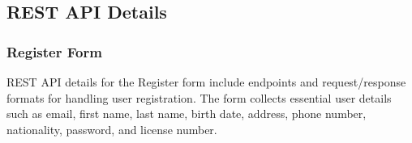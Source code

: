 \subsection{REST API Details}


\subsubsection*{Register Form}


REST API details for the Register form include endpoints and request/response formats for handling user registration. The form collects essential user details such as email, first name, last name, birth date, address, phone number, nationality, password, and license number.



